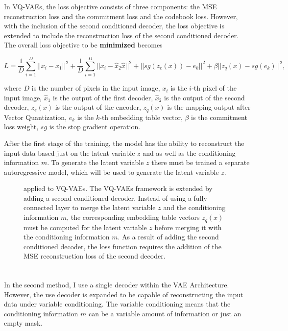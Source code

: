 In VQ-VAEs, the loss objective consists of three components: the MSE
reconstruction loss and the commitment loss and the codebook loss. However,
with the inclusion of the second conditioned decoder, the loss objective is
extended to include the reconstruction loss of the second conditioned decoder.
The overall loss objective to be \textbf{minimized} becomes

\[ L = \frac{1}{D} \sum_{i=1}^{D} ||x_i - \hat{x}_1 ||^2 + \frac{1}{D} \sum_{i=1}^{D} || x_i - \hat{x}_2 \hat{x} ||^2 + || sg(z_e(x)) - e_k ||^2 + \beta || z_q(x) - sg(e_k) ||^2 , \]

where $D$ is the number of pixels in the input image, $x_i$ is the $i$-th pixel
of the input image, $\hat{x}_1$ is the output of the first decoder, $\hat{x}_2$
is the output of the second decoder, $z_e(x)$ is the output of the encoder,
$z_q(x)$ is the mapping output after Vector Quantization, $e_k$ is the $k$-th
embedding table vector, $\beta$ is the commitment loss weight, $sg$ is the stop
gradient operation.

After the first stage of the training, the model has the ability to reconstruct
the input data based just on the latent variable $z$ and as well as the
conditioning information $m$. To generate the latent variable $z$ there must be
trained a separate autoregressive model, which will be used to generate the
latent variable $z$.

\begin{figure}[H]
    \centering
    
    \caption[ applied to VQ-VAEs.]%
    {
         applied to VQ-VAEs. The VQ-VAEs framework is extended by adding a second conditioned decoder. Instead of using a fully connected layer to merge the latent variable $z$ and the conditioning information $m$, the corresponding embedding table vectors $z_q(x)$ must be computed for the latent variable $z$ before merging it with the conditioning information $m$. As a result of adding the second conditioned decoder, the loss function requires the addition of the MSE reconstruction loss of the second decoder.
    }\label{SCVQVAE2DFigure}
\end{figure}

\section{}

In the second method, I use a single decoder within the VAE Architecture.
However, the use decoder is expanded to be capable of reconstructing the input
data under variable conditioning. The variable conditioning means that the
conditioning information $m$ can be a variable amount of information or just an
empty mask.

